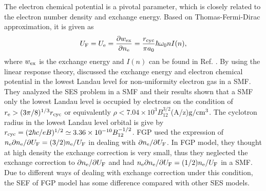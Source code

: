 \documentclass[manuscript]{aastex}
\begin{document}
The electron chemical potential is a pivotal parameter, which is
closely related to the electron number density and exchange energy.
Based on Thomas-Fermi-Dirac approximation, it is given as
\citep{Fushiki89}
\begin{equation}
 U_{\rm{F}}=U_{\rm{e}}=\frac{\partial w_{\rm{ex}}}{\partial n_{\rm{e}}}=\frac{r_{\rm{cyc}}}{\pi
 a_0}\hbar\omega_0nI(n),\label{56}
\end{equation}
where $w_{\rm{ex}}$ is the exchange energy and $I(n)$ can be found
in Ref. \citep{Fushiki89}. By using the linear response theory,
\citet{Fushiki89} discussed the exchange energy and electron
chemical potential in the lowest Landau level for non-uniformity
electron gas in a SMF. They analyzed the SES problem in a SMF and
their results shown that a SMF only the lowest Landau level is
occupied by electrons on the condition of
$r_{\rm{e}}>(3\pi/8)^{1/3}r_{\rm{cyc}}$ or equivalently
$\rho<7.04\times10^3B_{12}^{3/2}$(A/z)$\rm{g/cm^3}$. The cyclotron
radius in the lowest Landau level orbital is give by
$r_{\rm{cyc}}=(2\hbar c/eB)^{1/2}\simeq
3.36\times10^{-10}B_{12}^{-1/2}$. FGP used the expression of
$n_{\rm{e}}\partial n_{\rm{e}}/\partial
U_{\rm{F}}=(3/2)n_{\rm{e}}/U_{\rm{F}}$ in dealing with $\partial
n_{\rm{e}}/\partial U_{\rm{F}}$. In FGP model, they thought at high
density the exchange correction is very small, thus they neglected
the exchange correction to $\partial n_{\rm{e}}/\partial U_{\rm{F}}$
and had $n_{\rm{e}}\partial n_{\rm{e}}/\partial
U_{\rm{F}}=(1/2)n_{\rm{e}}/U_{\rm{F}}$ in a SMF. Due to different
ways of dealing with exchange correction under this condition, the
SEF of FGP model has some difference compared with other SES models.
\end{document}

